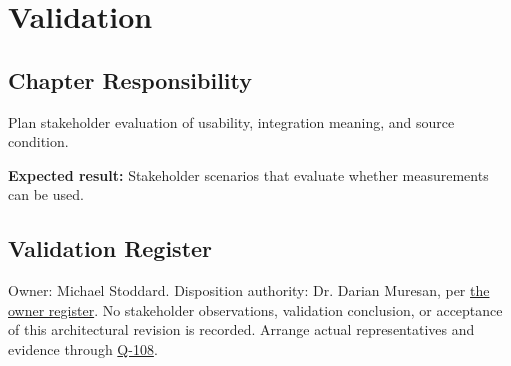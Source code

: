 \chapter{Validation}
\section{Chapter Responsibility}
\label{Section:ValidationResponsibility}
Plan stakeholder evaluation of usability, integration meaning, and source condition.

\noindent\textbf{Expected result:} Stakeholder scenarios that evaluate whether measurements can be used.

\section{Validation Register}
Owner: Michael Stoddard. Disposition authority: Dr. Darian Muresan, per \hyperref[Table:ProjectOwners]{the owner register}. No stakeholder observations, validation conclusion, or acceptance of this architectural revision is recorded. Arrange actual representatives and evidence through \hyperref[Question:Q-108]{Q-108}.

